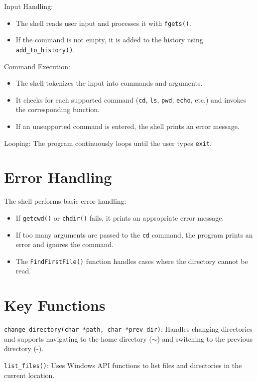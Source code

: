 \documentclass{article}
\begin{document}
Input Handling:

\begin{itemize}
\item The shell reads user input and processes it with \texttt{fgets()}.
\item If the command is not empty, it is added to the history using \texttt{add\_to\_history()}.
\end{itemize}

Command Execution:

\begin{itemize}
\item The shell tokenizes the input into commands and arguments.
\item It checks for each supported command (\texttt{cd}, \texttt{ls}, \texttt{pwd}, \texttt{echo}, etc.) and invokes the corresponding function.
\item If an unsupported command is entered, the shell prints an error message.
\end{itemize}

Looping: The program continuously loops until the user types \texttt{exit}.

\section{Error Handling}

The shell performs basic error handling:

\begin{itemize}
\item If \texttt{getcwd()} or \texttt{chdir()} fails, it prints an appropriate error message.
\item If too many arguments are passed to the \texttt{cd} command, the program prints an error and ignores the command.
\item The \texttt{FindFirstFile()} function handles cases where the directory cannot be read.
\end{itemize}

\section{Key Functions}

\texttt{change\_directory(char *path, char *prev\_dir)}: Handles changing directories and supports navigating to the home directory ($\sim$) and switching to the previous directory (-).

\texttt{list\_files()}: Uses Windows API functions to list files and directories in the current location.
\end{document}
